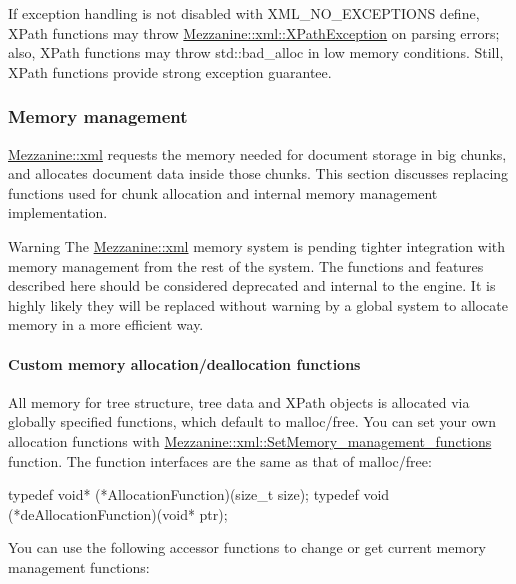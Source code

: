  \par
 If exception handling is not disabled with XML\_\-NO\_\-EXCEPTIONS define, XPath functions may throw \hyperlink{classMezzanine_1_1xml_1_1XPathException}{Mezzanine::xml::XPathException} on parsing errors; also, XPath functions may throw std::bad\_\-alloc in low memory conditions. Still, XPath functions provide strong exception guarantee. \par
 \par
 \hypertarget{XMLManual_XMLMemory}{}\subsubsection{Memory management}\label{XMLManual_XMLMemory}
\hyperlink{namespaceMezzanine_1_1xml}{Mezzanine::xml} requests the memory needed for document storage in big chunks, and allocates document data inside those chunks. This section discusses replacing functions used for chunk allocation and internal memory management implementation. \par
 \par
 \begin{DoxyWarning}{Warning}
The \hyperlink{namespaceMezzanine_1_1xml}{Mezzanine::xml} memory system is pending tighter integration with memory management from the rest of the system. The functions and features described here should be considered deprecated and internal to the engine. It is highly likely they will be replaced without warning by a global system to allocate memory in a more efficient way.
\end{DoxyWarning}
\par
 \par
 \hypertarget{XMLManual_XMLCustomAlloc}{}\paragraph{Custom memory allocation/deallocation functions}\label{XMLManual_XMLCustomAlloc}
All memory for tree structure, tree data and XPath objects is allocated via globally specified functions, which default to malloc/free. You can set your own allocation functions with \hyperlink{namespaceMezzanine_1_1xml_aca6a20ae32bb7188fc0248c257464956}{Mezzanine::xml::SetMemory\_\-management\_\-functions} function. The function interfaces are the same as that of malloc/free: 
\begin{DoxyCode}
 typedef void* (*AllocationFunction)(size_t size);
 typedef void (*deAllocationFunction)(void* ptr);
\end{DoxyCode}
 You can use the following accessor functions to change or get current memory management functions: 

